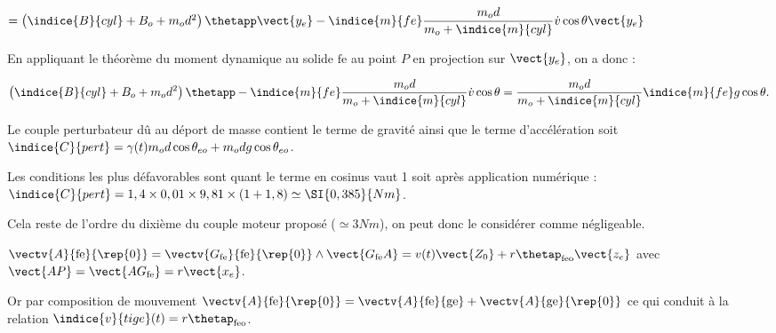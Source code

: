 \begin{corrige}
$ =\left( \indice{B}{cyl}+B_o+m_od^2\right) \thetapp \vect{y_e}  - \indice{m}{fe} \dfrac{m_od}{m_o+\indice{m}{cyl}} \dot{v} \cos \theta  \vect{y_e}
$


En appliquant le théorème du moment dynamique au solide $\text{fe}$ au point $P$ en projection sur  $\vect{y_e}$, on a donc : 

$$
\left( \indice{B}{cyl}+B_o+m_od^2\right) \thetapp  - \indice{m}{fe} \dfrac{m_od}{m_o+\indice{m}{cyl}} \dot{v} \cos \theta 
=  \dfrac{m_od}{m_o+\indice{m}{cyl}}\indice{m}{fe}g\cos\theta .
$$
\end{corrige}
\else
\fi

\question{}
\ifprof
\begin{corrige}
Le couple perturbateur dû au déport de masse contient le terme de gravité ainsi que le terme d'accélération soit 
$\indice{C}{pert} = \gamma(t) m_o d \cos\theta_{eo}+m_o d g \cos\theta_{eo}$.

Les conditions les plus défavorables sont quant le terme en cosinus vaut 1 soit après application numérique :
$\indice{C}{pert} = 1,4 \times 0,01 \times 9,81 \times (1+1,8) \simeq \SI{0,385}{Nm}$.

Cela reste de l'ordre du dixième du couple moteur  proposé ($\simeq{3}{Nm}$), on peut donc le considérer comme négligeable.
\end{corrige}
\else
\fi

\question{}
\ifprof
\begin{corrige}
$\vectv{A}{\text{fe}}{\rep{0}} =
\vectv{G_{\text{fe}}}{\text{fe}}{\rep{0}} \wedge \vect{G_{\text{fe}} A} = v(t) \vect{Z_0} + r\thetap_{\text{feo}}\vect{z_e}$ avec $\vect{AP}=\vect{AG_{\text{fe}}} = r\vect{x_e}$.

Or par composition de mouvement  
$\vectv{A}{\text{fe}}{\rep{0}}=
\vectv{A}{\text{fe}}{\text{ge}} +\vectv{A}{\text{ge}}{\rep{0}} $ ce qui conduit à la relation  $\indice{v}{tige}(t)=r\thetap_{\text{feo}}$.
\end{corrige}
\else
\fi

